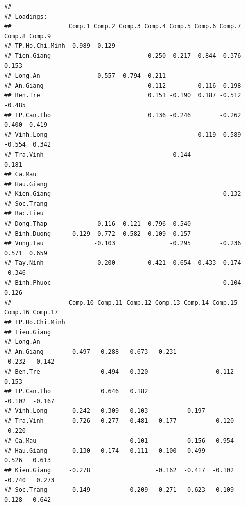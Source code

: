 \documentclass[../thesis.tex]{subfiles}
\begin{document}
\begin{verbatim}
##
## Loadings:
##                Comp.1 Comp.2 Comp.3 Comp.4 Comp.5 Comp.6 Comp.7 Comp.8 Comp.9
## TP.Ho.Chi.Minh  0.989  0.129                                                 
## Tien.Giang                          -0.250  0.217 -0.844 -0.376  0.153       
## Long.An               -0.557  0.794 -0.211                                   
## An.Giang                            -0.112        -0.116  0.198              
## Ben.Tre                              0.151 -0.190  0.187 -0.512        -0.485
## TP.Can.Tho                           0.136 -0.246        -0.262  0.400 -0.419
## Vinh.Long                                          0.119 -0.589 -0.554  0.342
## Tra.Vinh                                   -0.144                0.181       
## Ca.Mau                                                                       
## Hau.Giang                                                                    
## Kien.Giang                                               -0.132              
## Soc.Trang                                                                    
## Bac.Lieu                                                                     
## Dong.Thap              0.116 -0.121 -0.796 -0.540                            
## Binh.Duong      0.129 -0.772 -0.582 -0.109  0.157                            
## Vung.Tau              -0.103               -0.295        -0.236  0.571  0.659
## Tay.Ninh              -0.200         0.421 -0.654 -0.433  0.174 -0.346       
## Binh.Phuoc                                               -0.104         0.126
##                Comp.10 Comp.11 Comp.12 Comp.13 Comp.14 Comp.15 Comp.16 Comp.17
## TP.Ho.Chi.Minh                                                                
## Tien.Giang                                                                    
## Long.An                                                                       
## An.Giang        0.497   0.288  -0.673   0.231                  -0.232   0.142 
## Ben.Tre                -0.494  -0.320                   0.112           0.153 
## TP.Can.Tho              0.646   0.182                          -0.102  -0.167 
## Vinh.Long       0.242   0.309   0.103           0.197                         
## Tra.Vinh        0.726  -0.277   0.481  -0.177          -0.120  -0.220         
## Ca.Mau                          0.101          -0.156   0.954                 
## Hau.Giang       0.130   0.174   0.111  -0.100  -0.499           0.526   0.613 
## Kien.Giang     -0.278                  -0.162  -0.417  -0.102  -0.740   0.273 
## Soc.Trang       0.149          -0.209  -0.271  -0.623  -0.109   0.128  -0.642 

\end{verbatim}
\end{document}

